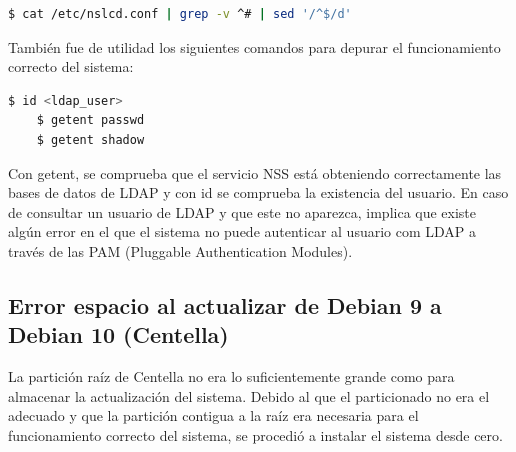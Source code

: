 \vspace{2mm}
\begin{lstlisting}[language=bash]
    $ cat /etc/nslcd.conf | grep -v ^# | sed '/^$/d'
\end{lstlisting}
\vspace{2mm}

También fue de utilidad los siguientes comandos para depurar el funcionamiento correcto del sistema:

\vspace{2mm}
\begin{lstlisting}[language=bash]
    $ id <ldap_user>
    $ getent passwd
    $ getent shadow
\end{lstlisting}
\vspace{2mm}

Con getent, se comprueba que el servicio NSS está obteniendo correctamente las bases de datos de LDAP y con id se comprueba la existencia del usuario. En caso de consultar un usuario de LDAP y que este no aparezca, implica que existe algún error en el que el sistema no puede autenticar al usuario com LDAP a través de las PAM \cite{linuxpam} (Pluggable Authentication Modules).



\subsection{Error espacio al actualizar de Debian 9 a Debian 10 (Centella)}

La partición raíz de Centella no era lo suficientemente grande como para almacenar la actualización del sistema. Debido al que el particionado no era el adecuado y que la partición contigua a la raíz era necesaria para el funcionamiento correcto del sistema, se procedió a instalar el sistema desde cero.
